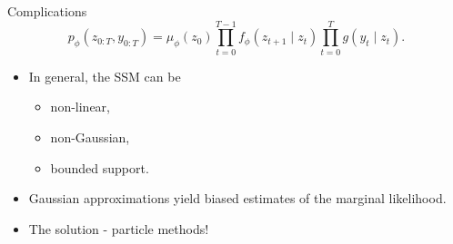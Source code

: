 \documentclass[10pt, aspectratio=1610]{beamer}
\begin{document}
    \begin{frame}{Complications}
      \begin{equation}
        p_{\phi}(z_{0:T}, y_{0:T}) = \mu_{\phi}(z_0) \prod_{t=0}^{T-1} f_{\phi}(z_{t+1} \mid z_t) \prod_{t=0}^T g(y_t \mid z_t).
      \end{equation}
      \begin{itemize}
        \item In general, the SSM can be
        \begin{itemize}
          \item non-linear,
          \item non-Gaussian,
          \item bounded support.
        \end{itemize}
      \item Gaussian approximations yield biased estimates of the marginal likelihood.
      \item The solution - particle methods!
      \end{itemize}
    \end{frame}
\end{document}

